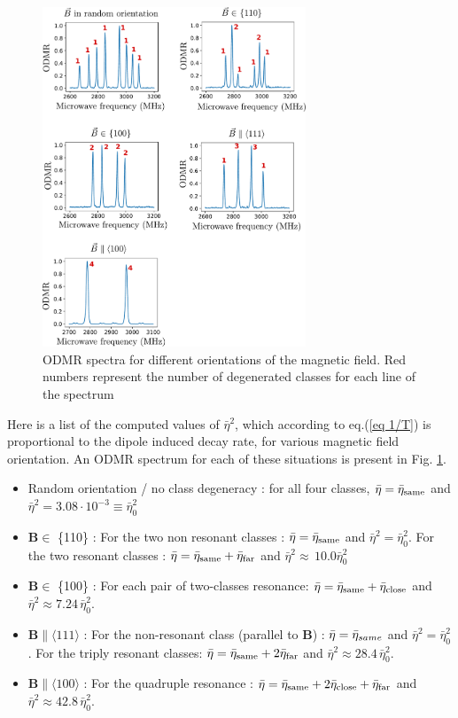 \documentclass[preprintnumbers,amsmath,amssymb,onecolumn,12pt]{revtex4-2}\usepackage{graphicx}%
\begin{document}
\begin{figure}
\includegraphics[width=0.7\textwidth]{Figures_SI/Various_ESR}
\caption{ODMR spectra for different orientations of the magnetic field. Red numbers represent the number of degenerated classes for each line of the spectrum}
\label{Various ODMR}
\end{figure}

Here is a list of the computed values of $\bar \eta^2$, which according to eq.(\ref{eq 1/T}) is proportional to the dipole induced decay rate, for various magnetic field orientation. An ODMR spectrum for each of these situations is present in Fig. \ref{Various ODMR}.
\begin{itemize}
\item Random orientation / no class degeneracy : for all four classes, $\bar \eta = \bar {\eta}_{\rm same}$ and $\bar \eta^2=3.08 \cdot 10^{-3} \equiv \bar \eta_0^2$
\item $\bm{B} \in$ \{110\} : For the two non resonant classes : $\bar \eta = \bar {\eta}_{\rm same}$ and $\bar \eta^2= \bar \eta_0^2$.  For the two resonant classes : $\bar \eta = \bar {\eta}_{\rm same} + \bar {\eta}_{\rm far}$ and $\bar \eta^2\approx\, 10.0 \bar \eta_0^2$
\item $\bm{B} \in$ \{100\} : For each pair of two-classes resonance: $\bar \eta = \bar {\eta}_{\rm same}+\bar {\eta}_{\rm close}$ and $\bar \eta^2\approx 7.24\, \bar \eta_0^2$. 
\item $\bm{B} \parallel \langle 111 \rangle$ : For the non-resonant class (parallel to $\bm B$) : $\bar \eta = \bar {\rm \eta}_{same}$ and $\bar \eta^2= \bar \eta_0^2$. For the triply resonant classes: $\bar \eta = \bar {\eta}_{\rm same}+2\bar {\eta}_{\rm far}$ and $\bar \eta^2\approx 28.4\, \bar \eta_0^2$. 
\item $\bm{B} \parallel \langle 100 \rangle$ : For the quadruple resonance : $\bar \eta = \bar {\eta}_{\rm same}+2\bar {\eta}_{\rm close} + \bar {\eta}_{\rm far}$  and $\bar \eta^2\approx 42.8\, \bar \eta_0^2$.
\end{itemize}
\end{document}
